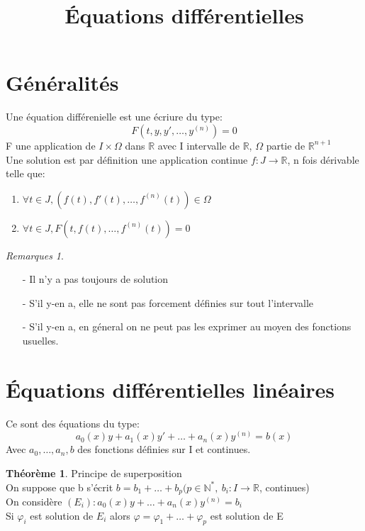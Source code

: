 \documentclass[fleqn]{article}
\title{\'Equations diff\'erentielles}
\date{}
\theoremstyle{definition} \newtheorem*{defi}{D\'efinition}
\theoremstyle{definition} \newtheorem*{theo}{Th\'eor\`eme}
\theoremstyle{remark} \newtheorem*{rqs}{Remarques}
\begin{document}
\maketitle

\section{G\'en\'eralit\'es}
Une \'equation diff\'erenielle est une \'ecriure du type:
\[F(t, y, y', \hdots, y^{(n)}) = 0\]
F une application de $I \times \Omega$ dans $\mathbb{R}$ avec I intervalle de $\mathbb{R}$, $\Omega$ partie de $\mathbb{R}^{n+1}$\\
Une solution est par d\'efinition une application continue $f:J\rightarrow \mathbb{R}$, n fois d\'erivable telle que:
\begin{enumerate}
	\item $\forall t \in J, (f(t), f'(t), \hdots, f^{(n)}(t)) \in \Omega$
	\item $\forall t \in J, F(t, f(t), \hdots, f^{(n)}(t)) = 0$
\end{enumerate}

\begin{rqs} $ $
	\begin{itemize}
		\item [-] Il n'y a pas toujours de solution
		\item [-] S'il y-en a, elle ne sont pas forcement d\'efinies sur tout l'intervalle
		\item [-] S'il y-en a, en g\'eneral on ne peut pas les exprimer au moyen des fonctions usuelles.
	\end{itemize}
\end{rqs}

\section{\'Equations diff\'erentielles lin\'eaires}
Ce sont des \'equations du type:
\[a_0(x)y + a_1(x)y' + \hdots + a_n(x)y^{(n)} = b(x)\]
Avec $a_0, \hdots, a_n, b$ des fonctions d\'efinies sur I et continues.\\

\begin{theo} Principe de superposition \\
	On suppose que b s'\'ecrit $b = b_1 + \hdots + b_p (p \in \mathbb{N}^{*},\ b_i : I \rightarrow \mathbb{R}$,  continues)\\
	On consid\`ere $(E_i): a_0(x)y + \hdots + a_n(x) y^{(n)} = b_i$ \\
	Si $\varphi_i$ est solution de $E_i$ alors $\varphi = \varphi_1 + \hdots + \varphi_p$ est solution de E
\end{theo}
\end{document}
